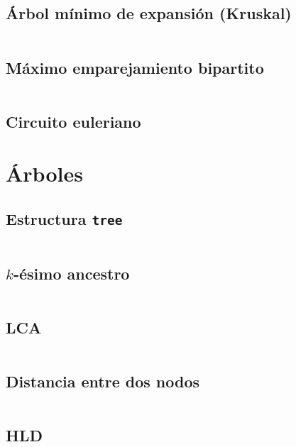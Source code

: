 \documentclass[11pt]{article}
\begin{document}
		\subsection{Árbol mínimo de expansión (Kruskal)}
		\inputminted[tabsize=2,breaklines,firstline=337,lastline=353,fontsize=\small]{c++}{graph.cpp}
		
		\subsection{Máximo emparejamiento bipartito}
		\inputminted[tabsize=2,breaklines,firstline=355,lastline=409,fontsize=\small]{c++}{graph.cpp}
		
		\subsection{Circuito euleriano}
		
		
	\newpage
	\section{Árboles}		
		\subsection{Estructura \texttt{tree}}
		\inputminted[tabsize=2,breaklines,firstline=432,lastline=470,fontsize=\small]{c++}{graph.cpp}
		
		\subsection{$k$-ésimo ancestro}
		\inputminted[tabsize=2,breaklines,firstline=472,lastline=484,fontsize=\small]{c++}{graph.cpp}
		
		\subsection{LCA}
		\inputminted[tabsize=2,breaklines,firstline=486,lastline=505,fontsize=\small]{c++}{graph.cpp}
		
		\subsection{Distancia entre dos nodos}
		\inputminted[tabsize=2,breaklines,firstline=507,lastline=530,fontsize=\small]{c++}{graph.cpp}
		
		\subsection{HLD}
		
\end{document}
